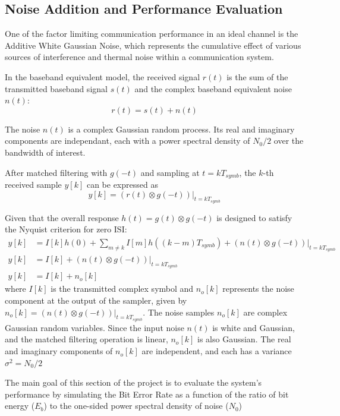 \subsection{Noise Addition and Performance Evaluation}
One of the factor limiting communication performance in an ideal channel is the Additive White Gaussian Noise, which represents the cumulative effect of various sources of interference and thermal noise within a communication system.\par

In the baseband equivalent model, the received signal $r(t)$ is the sum of the transmitted baseband signal $s(t)$ and the complex baseband equivalent noise $n(t)$:
\begin{equation}
    r(t) = s(t) + n(t)
\end{equation} \par
The noise $n(t)$ is a complex Gaussian random process. Its real and imaginary components are independant, each with a power spectral density of ${N_0}/{2}$ over the bandwidth of interest.\par
After matched filtering with $g(-t)$ and sampling at $t = kT_{symb}$, the $k$-th received sample $y[k]$
can be expressed as
\begin{equation}
    y[k] = (r(t) \otimes g(-t))|_{t=kT_{symb}}
\end{equation}
\par
Given that the overall response $h(t) = g(t) \otimes g(-t)$ is designed to satisfy the Nyquist criterion for zero ISI:
\begin{align}
    y[k] &= I[k]h(0) + \sum_{m \neq k} I[m]h((k-m)T_{symb}) + (n(t) \otimes g(-t))|_{t=kT_{symb}}\\
    y[k] &= I[k] + (n(t) \otimes g(-t))|_{t=kT_{symb}}\\
    y[k] &= I[k] + n_o[k]
\end{align}
where $I[k]$ is the transmitted complex symbol and $n_o[k]$ represents the noise component at the output of the sampler, given by $n_o[k] = (n(t) \otimes g(-t))|_{t=kT_{symb}}$. The noise samples $n_o[k]$ are complex Gaussian random variables. Since the input noise $n(t)$ is white and Gaussian, and the matched filtering operation is linear, $n_o[k]$ is also Gaussian. The real and imaginary components of $n_o[k]$ are independent, and each has a variance $\sigma^2 = N_0/2$ \par

The main goal of this section of the project is to evaluate the system's performance by simulating the Bit Error Rate as a function of the ratio of bit energy ($E_b$) to the one-sided power spectral density of noise ($N_0$)

